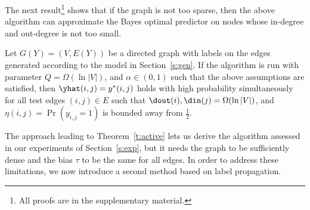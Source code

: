The next result\footnote
{
All proofs are in the supplementary material.
} 
shows that if the graph is not too sparse, then the above algorithm can approximate the Bayes optimal predictor on nodes whose in-degree and out-degree is not too small.
%
%

\begin{theorem}
\label{t:active}
Let $G(Y) = (V,E(Y))$ be a directed graph with labels on the edges generated according to the model in Section~\ref{s:gen}.
If the algorithm is run with parameter $Q = \Omega(\ln|V|)$, and $\alpha \in (0,1)$ such that the above assumptions are satisfied, then $\yhat(i,j) = y^*(i,j)$ holds with high probability simultaneously for all test edges $(i,j) \in E$ such that $\dout(i),\din(j) = \Omega(\ln|V|)$, and $\eta(i,j) = \Pr(y_{i,j}=1)$ is bounded away from $\tfrac{1}{2}$. 
\end{theorem}
%



The approach leading to Theorem~\ref{t:active} lets us derive the \usrule{}
algorithm assessed in our experiments of Section~\ref{s:exp}, but it needs the graph to be
sufficiently dense and the bias $\tau$ to be the same for all edges. In order to
address these limitations, we now introduce a second method based on label
propagation.


